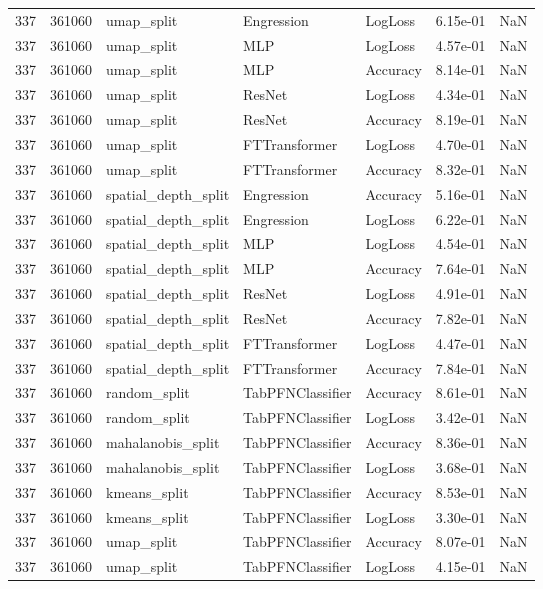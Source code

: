 \begin{tabular}{rrlllrr}
337 & 361060 & umap\_split & Engression & LogLoss & 6.15e-01 & NaN \\
337 & 361060 & umap\_split & MLP & LogLoss & 4.57e-01 & NaN \\
337 & 361060 & umap\_split & MLP & Accuracy & 8.14e-01 & NaN \\
337 & 361060 & umap\_split & ResNet & LogLoss & 4.34e-01 & NaN \\
337 & 361060 & umap\_split & ResNet & Accuracy & 8.19e-01 & NaN \\
337 & 361060 & umap\_split & FTTransformer & LogLoss & 4.70e-01 & NaN \\
337 & 361060 & umap\_split & FTTransformer & Accuracy & 8.32e-01 & NaN \\
337 & 361060 & spatial\_depth\_split & Engression & Accuracy & 5.16e-01 & NaN \\
337 & 361060 & spatial\_depth\_split & Engression & LogLoss & 6.22e-01 & NaN \\
337 & 361060 & spatial\_depth\_split & MLP & LogLoss & 4.54e-01 & NaN \\
337 & 361060 & spatial\_depth\_split & MLP & Accuracy & 7.64e-01 & NaN \\
337 & 361060 & spatial\_depth\_split & ResNet & LogLoss & 4.91e-01 & NaN \\
337 & 361060 & spatial\_depth\_split & ResNet & Accuracy & 7.82e-01 & NaN \\
337 & 361060 & spatial\_depth\_split & FTTransformer & LogLoss & 4.47e-01 & NaN \\
337 & 361060 & spatial\_depth\_split & FTTransformer & Accuracy & 7.84e-01 & NaN \\
337 & 361060 & random\_split & TabPFNClassifier & Accuracy & 8.61e-01 & NaN \\
337 & 361060 & random\_split & TabPFNClassifier & LogLoss & 3.42e-01 & NaN \\
337 & 361060 & mahalanobis\_split & TabPFNClassifier & Accuracy & 8.36e-01 & NaN \\
337 & 361060 & mahalanobis\_split & TabPFNClassifier & LogLoss & 3.68e-01 & NaN \\
337 & 361060 & kmeans\_split & TabPFNClassifier & Accuracy & 8.53e-01 & NaN \\
337 & 361060 & kmeans\_split & TabPFNClassifier & LogLoss & 3.30e-01 & NaN \\
337 & 361060 & umap\_split & TabPFNClassifier & Accuracy & 8.07e-01 & NaN \\
337 & 361060 & umap\_split & TabPFNClassifier & LogLoss & 4.15e-01 & NaN \\

\end{tabular}
